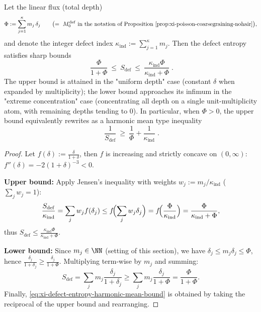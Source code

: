 \begin{proposition}\label{prop:xi-defect-entropy-feasible-interval-flux-index}
Let the linear flux (total depth)
\[
\Phi:=\sum_{j=1}^{\kappa}m_j\,\delta_j
\qquad\bigl(=\ M_0^{\mathrm{def}}\ \text{in the notation of Proposition \ref{prop:xi-poisson-coarsegraining-nohair}}\bigr),
\]
and denote the integer defect index \(\kappa_{\mathrm{ind}}:=\sum_{j=1}^{\kappa}m_j\).
Then the defect entropy satisfies sharp bounds
\begin{equation}\label{eq:xi-defect-entropy-feasible-interval}
\boxed{\;
\frac{\Phi}{1+\Phi}
\ \le\
S_{\mathrm{def}}
\ \le\
\frac{\kappa_{\mathrm{ind}}\Phi}{\kappa_{\mathrm{ind}}+\Phi}\; }.
\end{equation}
The upper bound is attained in the "uniform depth" case (constant \(\delta\) when expanded by multiplicity); the lower bound approaches its infimum in the "extreme concentration" case (concentrating all depth on a single unit-multiplicity atom, with remaining depths tending to \(0\)).
In particular, when \(\Phi>0\), the upper bound equivalently rewrites as a harmonic mean type inequality
\begin{equation}\label{eq:xi-defect-entropy-harmonic-mean-bound}
\boxed{\;
\frac{1}{S_{\mathrm{def}}}\ \ge\ \frac{1}{\Phi}+\frac{1}{\kappa_{\mathrm{ind}}}\; }.
\end{equation}
\end{proposition}

\begin{proof}
Let \(f(\delta):=\frac{\delta}{1+\delta}\), then \(f\) is increasing and strictly concave on \((0,\infty)\):
\(
f''(\delta)=-2(1+\delta)^{-3}<0
\).
\par
\textbf{Upper bound:}
Apply Jensen's inequality with weights \(w_j:=m_j/\kappa_{\mathrm{ind}}\) (\(\sum_j w_j=1\)):
\[
\frac{S_{\mathrm{def}}}{\kappa_{\mathrm{ind}}}
=\sum_{j}w_j f(\delta_j)
\le f\!\Bigl(\sum_j w_j\delta_j\Bigr)
=f\!\Bigl(\frac{\Phi}{\kappa_{\mathrm{ind}}}\Bigr)
=\frac{\Phi}{\kappa_{\mathrm{ind}}+\Phi},
\]
thus \(S_{\mathrm{def}}\le \frac{\kappa_{\mathrm{ind}}\Phi}{\kappa_{\mathrm{ind}}+\Phi}\).
\par
\textbf{Lower bound:}
Since \(m_j\in\NN\) (setting of this section), we have \(\delta_j\le m_j\delta_j\le \Phi\), hence
\(
\frac{\delta_j}{1+\delta_j}\ge \frac{\delta_j}{1+\Phi}
\).
Multiplying term-wise by \(m_j\) and summing:
\[
S_{\mathrm{def}}
=\sum_j m_j\frac{\delta_j}{1+\delta_j}
\ge \sum_j m_j\frac{\delta_j}{1+\Phi}
=\frac{\Phi}{1+\Phi}.
\]
Finally, \eqref{eq:xi-defect-entropy-harmonic-mean-bound} is obtained by taking the reciprocal of the upper bound and rearranging.
\end{proof}

